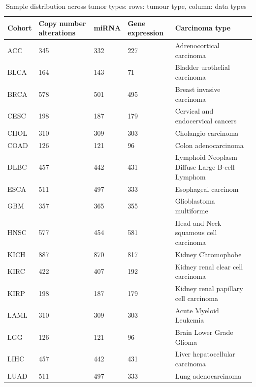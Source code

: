 
\begin{table} [h]
\centering
    \scriptsize
    \caption{Sample distribution across tumor types: rows: tumour type, column: data types~\cite{weinstein2013cancer}}
    \label{table:alldatadetails2}
    \vspace{-2mm}
    \begin{tabular}{l|l|l|l|l}
        \hline
        \rowcolor{Gray}
         \textbf{Cohort} & \textbf{Copy number alterations} & \textbf{miRNA} & \textbf{Gene expression} & \textbf{Carcinoma type} \\\hline
            ACC & 345 & 332 & 227 & Adrenocortical carcinoma \\\hline
            BLCA & 164 & 143 & 71 & Bladder urothelial carcinoma \\\hline%
            BRCA  & 578 & 501 & 495 & Breast invasive carcinoma \\\hline
            CESC & 198 & 187 & 179 & Cervical and endocervical cancers	\\\hline%
            CHOL & 310 & 309 & 303 & Cholangio carcinoma \\\hline 
            COAD & 126 & 121 & 96 & Colon adenocarcinoma \\\hline 
            DLBC & 457 & 442 & 431 & Lymphoid Neoplasm Diffuse Large B-cell Lymphom  \\\hline
            ESCA & 511 & 497 & 333 & Esophageal carcinom \\\hline
            GBM & 357 & 365 & 355 & Glioblastoma multiforme \\\hline
            HNSC   & 577 & 454 & 581 & Head and Neck squamous cell carcinoma \\\hline
            KICH & 887 & 870 & 817 & Kidney Chromophobe  \\\hline
            KIRC & 422 & 407 & 192 & Kidney renal clear cell carcinoma \\\hline
            KIRP & 198 & 187 & 179 & Kidney renal papillary cell carcinoma	\\\hline%
            LAML & 310 & 309 & 303 & Acute Myeloid Leukemia \\\hline 
            LGG & 126 & 121 & 96 & Brain Lower Grade Glioma \\\hline 
            LIHC & 457 & 442 & 431 & Liver hepatocellular carcinoma  \\\hline
            LUAD & 511 & 497 & 333 & Lung adenocarcinoma \\\hline

\end{tabular}
\end{table}
